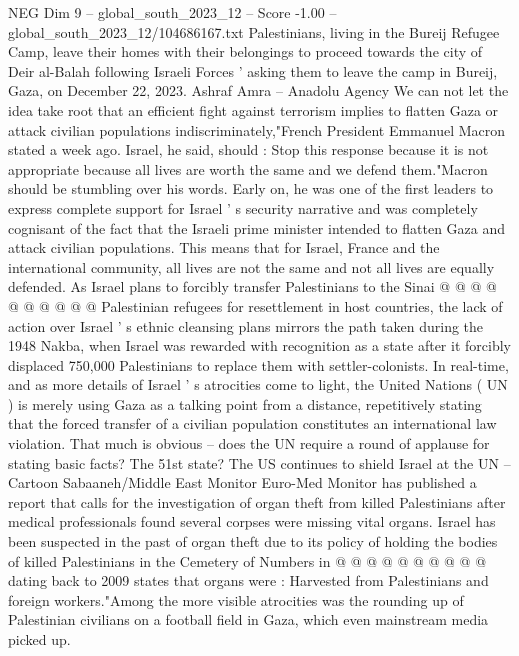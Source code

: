 \begin{textsample}{NEG Dim 9 – global\_south\_2023\_12 – Score -1.00 – global\_south\_2023\_12/104686167.txt}  \label{ex:f9_neg_439}
Palestinians, living in the Bureij Refugee Camp, leave their homes with their belongings to proceed towards the city of Deir al-Balah following Israeli Forces ' asking them to leave the camp in Bureij, Gaza, on December 22, 2023.
Ashraf Amra -- Anadolu Agency We can not let the idea take root that an efficient fight against terrorism implies to flatten Gaza or attack civilian populations indiscriminately,"French President Emmanuel Macron stated a week ago.
Israel, he said, should : Stop this response because it is not appropriate because all lives are worth the same and we defend them."Macron should be stumbling over his words.
Early on, he was one of the first leaders to express complete support for Israel ' s security narrative and was completely cognisant of the fact that the Israeli prime minister intended to flatten Gaza and attack civilian populations.
This means that for Israel, France and the international community, all lives are not the same and not all lives are equally defended.
As Israel plans to forcibly transfer Palestinians to the Sinai @ @ @ @ @ @ @ @ @ @ Palestinian refugees for resettlement in host countries, the lack of action over Israel ' s ethnic cleansing plans mirrors the path taken during the 1948 Nakba, when Israel was rewarded with recognition as a state after it forcibly displaced 750,000 Palestinians to replace them with settler-colonists.
In real-time, and as more details of Israel ' s atrocities come to light, the United Nations ( UN ) is merely using Gaza as a talking point from a distance, repetitively stating that the forced transfer of a civilian population constitutes an international law violation.
That much is obvious -- does the UN require a round of applause for stating basic facts?
The 51st state?
The US continues to shield Israel at the UN -- Cartoon Sabaaneh/Middle East Monitor Euro-Med Monitor has published a report that calls for the investigation of organ theft from killed Palestinians after medical professionals found several corpses were missing vital organs.
Israel has been suspected in the past of organ theft due to its policy of holding the bodies of killed Palestinians in the Cemetery of Numbers in @ @ @ @ @ @ @ @ @ @ dating back to 2009 states that organs were : Harvested from Palestinians and foreign workers."Among the more visible atrocities was the rounding up of Palestinian civilians on a football field in Gaza, which even mainstream media picked up.

\end{textsample}
